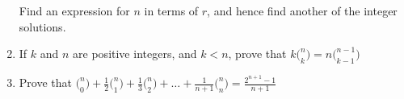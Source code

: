 \documentclass[../main.tex]{subfiles}
\begin{document}
\begin{enumerate}[itemsep=1cm]
    Find an expression for \(n\) in terms of \(r\), and hence find another of the integer solutions.

    \item
    If $k$ and $n$ are positive integers, and $k<n$, prove that \(k\bigl(^n_k\bigr)=n\bigl(^{n-1}_{k-1}\bigr)\)

    \item 
    Prove that \(\bigl(^n_0 \bigr) +\frac{1}{2}\bigl(^n_1 \bigr)+\frac{1}{3}\bigl(^n_2 \bigr)+\dots+\frac{1}{n+1}\bigl(^n_n \bigr)=\frac{2^{n+1}-1}{n+1} \)

\end{enumerate}
\end{document}
